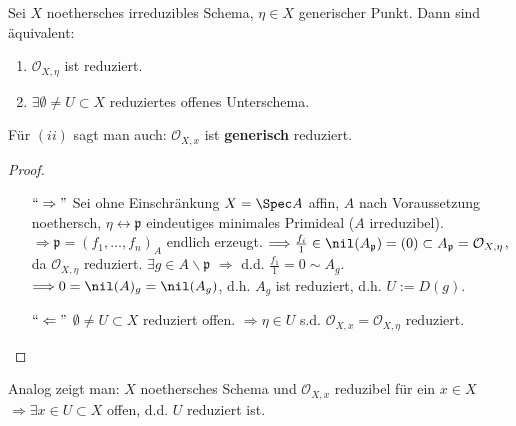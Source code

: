 \begin{prop}[24]
  Sei $X$ noethersches irreduzibles Schema, $\eta\in X$ generischer
  Punkt. Dann sind äquivalent:
  \begin{enumerate}
  \item $\mathcal{O}_{X,\eta}$ ist reduziert.
  \item $\exists\emptyset\neq U\subset X$ reduziertes offenes Unterschema.
  \end{enumerate}
  Für $(ii)$ sagt man auch: $\mathcal{O}_{X,x}$ ist \textbf{generisch}
  reduziert.
\end{prop}

\begin{proof}
  \mbox{}
  \begin{itemize}
  \item[$``\Rightarrow"$] Sei ohne Einschränkung $X=\Spec A$ affin, $A$ nach Voraussetzung
    noethersch, $\eta\leftrightarrow\mathfrak{p}$ eindeutiges minimales
    Primideal ($A$ irreduzibel). $\Longrightarrow\mathfrak{p}=(f_{1},\ldots,f_{n})_{A}$
    endlich erzeugt. $\Longrightarrow\frac{f_{i}}{1}\in\nil(A_{\mathfrak{p}})=(0)\subset A_{\mathfrak{p}}=\mathcal{O}_{X,\eta}$,
    da $\mathcal{O}_{X,\eta}$ reduziert. $\exists g\in A\backslash\mathfrak{p}$
    $\Longrightarrow$ d.d. $\frac{f_{1}}{1}=0\sim A_{g}$. $\Longrightarrow0=\nil(A)_{g}=\nil(A_{g})$,
    d.h. $A_{g}$ ist reduziert, d.h. $U:=D(g)$.
  \item[$``\Leftarrow"$] $\emptyset\neq U\subset X$ reduziert offen. $\Longrightarrow\eta\in U$
    s.d. $\mathcal{O}_{X,x}=\mathcal{O}_{X,\eta}$ reduziert.
  \end{itemize}
\end{proof}
\begin{rem*}
  Analog zeigt man: $X$ noethersches Schema und $\mathcal{O}_{X,x}$
  reduzibel für ein $x\in X$ $\Longrightarrow\exists x\in U\subset X$
  offen, d.d. $U$ reduziert ist.
\end{rem*}
